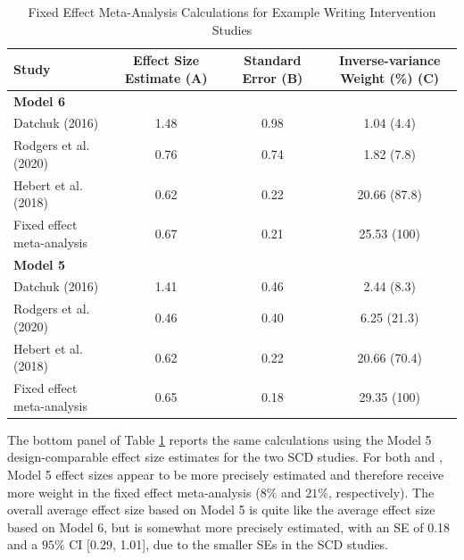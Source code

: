 \documentclass[
]{book}
\begin{document}
\begin{table}

\caption{\label{tab:ES-est-chapter5}Fixed Effect Meta-Analysis Calculations for 
             Example Writing Intervention Studies}
\centering
\begin{tabular}[t]{l|c|c|c}
\hline
Study & Effect Size Estimate (A) & Standard Error (B) & Inverse-variance Weight (\%) (C)\\
\hline
\multicolumn{4}{l}{\textbf{Model 6}}\\
\hline
\hspace{1em}Datchuk (2016) & 1.48 & 0.98 & 1.04 (4.4)\\
\hline
\hspace{1em}Rodgers et al. (2020) & 0.76 & 0.74 & 1.82 (7.8)\\
\hline
\hspace{1em}Hebert et al. (2018) & 0.62 & 0.22 & 20.66 (87.8)\\
\hline
\hspace{1em}Fixed effect meta-analysis & 0.67 & 0.21 & 25.53 (100)\\
\hline
\multicolumn{4}{l}{\textbf{Model 5}}\\
\hline
\hspace{1em}Datchuk (2016) & 1.41 & 0.46 & 2.44 (8.3)\\
\hline
\hspace{1em}Rodgers et al. (2020) & 0.46 & 0.40 & 6.25 (21.3)\\
\hline
\hspace{1em}Hebert et al. (2018) & 0.62 & 0.22 & 20.66 (70.4)\\
\hline
\hspace{1em}Fixed effect meta-analysis & 0.65 & 0.18 & 29.35 (100)\\
\hline
\end{tabular}
\end{table}

The bottom panel of Table \ref{tab:ES-est-chapter5} reports the same calculations using the Model 5 design-comparable effect size estimates for the two SCD studies. For both \citet{datchuk2016Writing} and \citet{rodgers2021Effects}, Model 5 effect sizes appear to be more precisely estimated and therefore receive more weight in the fixed effect meta-analysis (\(8\%\) and \(21\%\), respectively). The overall average effect size based on Model 5 is quite like the average effect size based on Model 6, but is somewhat more precisely estimated, with an SE of 0.18 and a \(95\%\) CI {[}0.29, 1.01{]}, due to the smaller SEs in the SCD studies.
\end{document}
